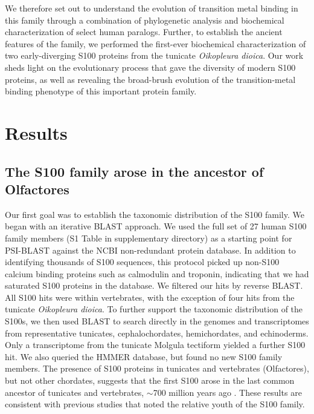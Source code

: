 We therefore set out to understand the evolution of transition metal
binding in this family through a combination of phylogenetic analysis
and biochemical characterization of select human paralogs. Further,
to establish the ancient features of the family, we performed the
first-ever biochemical characterization of two early-diverging S100
proteins from the tunicate \textit{Oikopleura dioica}. Our work sheds
light on the evolutionary process that gave the diversity of modern
S100 proteins, as well as revealing the broad-brush evolution of the
transition-metal binding phenotype of this important protein family.


\section{Results}

\subsection{The S100 family arose in the ancestor of Olfactores}

Our first goal was to establish the taxonomic distribution of the
S100 family. We began with an iterative BLAST approach. We used the
full set of 27 human S100 family members (S1 Table in supplementary directory) as a starting
point for PSI-BLAST against the NCBI non-redundant protein database.
In addition to identifying thousands of S100 sequences, this protocol
picked up non-S100 calcium binding proteins such as calmodulin and
troponin, indicating that we had saturated S100 proteins in the database.
We filtered our hits by reverse BLAST. All S100 hits were within vertebrates,
with the exception of four hits from the tunicate \textit{Oikopleura
dioica}. To further support the taxonomic distribution of the S100s,
we then used BLAST to search directly in the genomes and transcriptomes
from representative tunicates, cephalochordates, hemichordates, and
echinoderms. Only a transcriptome from the tunicate Molgula tectiform
yielded a further S100 hit. We also queried the HMMER database, but
found no new S100 family members. The presence of S100 proteins in
tunicates and vertebrates (Olfactores), but not other chordates, suggests
that the first S100 arose in the last common ancestor of tunicates
and vertebrates, $\sim$700 million years ago \cite{hedges_molecular_2006}.
These results are consistent with previous studies that noted the
relative youth of the S100 family\cite{zimmer_evolution_2013,marenholz_s100_2004,kraemer_structural_2008,shang_chromosomal_2008}.


